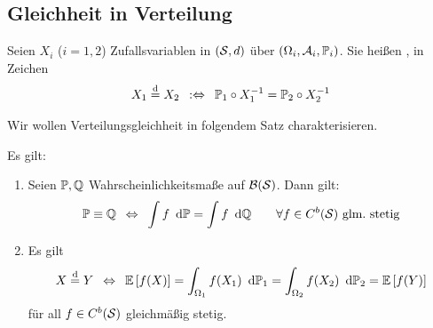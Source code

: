 
\subsection{Gleichheit in Verteilung}
\begin{definition} \label{definition: 3.16}
	Seien $X_i$ ($i = 1,2$) Zufallsvariablen in $(\S,d)$ über $(\Omega_i,\A_i,\P_i)$. Sie heißen , in Zeichen
	\begin{align*}
		X_1 \disteq X_2 \defequiv \P_1 \circ X_1^{-1} = \P_2 \circ X_2^{-1}
	\end{align*}
\end{definition}

Wir wollen Verteilungsgleichheit in folgendem Satz charakterisieren.

\begin{satz} \label{satz: 3.17}
	Es gilt:
	\begin{enumerate}[label=(\alph*)]
		\item \label{it: 3.17f} Seien $\P,\Q$ Wahrscheinlichkeitsmaße auf $\B(\S)$. Dann gilt:
		\begin{equation*}
			\P \equiv \Q
			\equivalent
			\int f \diffskip\P = \int f \diffskip\Q \qquad \forall f \in C^b(\S) \text{ glm.\ stetig}
		\end{equation*}
		\item \label{it: 3.17E} Es gilt
		\begin{equation*}
			X \disteq Y \equivalent
			\EW[f(X)] = \int_{\Omega_1} f(X_1)  \diffskip{\P_1} = \int_{\Omega_2} f(X_2)  \diffskip{\P_2} = \EW[f(Y)]
		\end{equation*}
		für all $f \in C^b(\S)$ gleichmäßig stetig.
	\end{enumerate}
\end{satz}

